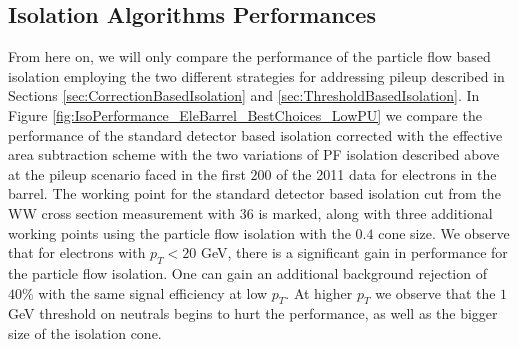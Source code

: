 \subsection{Isolation Algorithms Performances}

From here on, we will only compare the performance of the particle flow based isolation employing
the two different strategies for addressing pileup described in Sections 
\ref{sec:CorrectionBasedIsolation} and \ref{sec:ThresholdBasedIsolation}. 
In Figure \ref{fig:IsoPerformance_EleBarrel_BestChoices_LowPU} we compare the performance of the 
standard detector based isolation corrected with the effective area subtraction scheme with the 
two variations of PF isolation described above at the pileup 
scenario faced in the first $200$ \ipb of the 2011 data for electrons in the barrel. The working 
point for the standard detector based isolation cut from the WW  cross section measurement with 
$36$ \ipb is marked, along with three additional working points using the particle flow isolation 
with the $0.4$ cone size. We observe that for electrons with $p_{T} < 20$ GeV, there is a 
significant gain in performance for the particle flow isolation. One can gain an additional 
background rejection of $40\%$ with the same signal efficiency at low $p_{T}$. At higher $p_{T}$ 
we observe that the $1$GeV threshold on neutrals begins to hurt the performance, as well as the 
bigger size of the isolation cone. 


